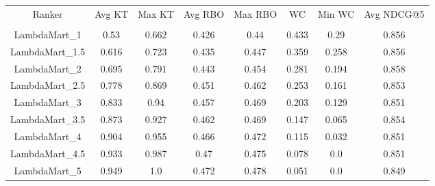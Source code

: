 \begin{longtable}{*{8}{c}}
Ranker & Avg KT & Max KT & Avg RBO & Max RBO & WC & Min WC & Avg NDCG@5\\\\ 
LambdaMart_1 & 0.53 & 0.662 & 0.426 & 0.44 & 0.433 & 0.29 & 0.856 \\ 
LambdaMart_1.5 & 0.616 & 0.723 & 0.435 & 0.447 & 0.359 & 0.258 & 0.856 \\ 
LambdaMart_2 & 0.695 & 0.791 & 0.443 & 0.454 & 0.281 & 0.194 & 0.858 \\ 
LambdaMart_2.5 & 0.778 & 0.869 & 0.451 & 0.462 & 0.253 & 0.161 & 0.853 \\ 
LambdaMart_3 & 0.833 & 0.94 & 0.457 & 0.469 & 0.203 & 0.129 & 0.851 \\ 
LambdaMart_3.5 & 0.873 & 0.927 & 0.462 & 0.469 & 0.147 & 0.065 & 0.854 \\ 
LambdaMart_4 & 0.904 & 0.955 & 0.466 & 0.472 & 0.115 & 0.032 & 0.851 \\ 
LambdaMart_4.5 & 0.933 & 0.987 & 0.47 & 0.475 & 0.078 & 0.0 & 0.851 \\ 
LambdaMart_5 & 0.949 & 1.0 & 0.472 & 0.478 & 0.051 & 0.0 & 0.849 \\ 
\end{longtable}